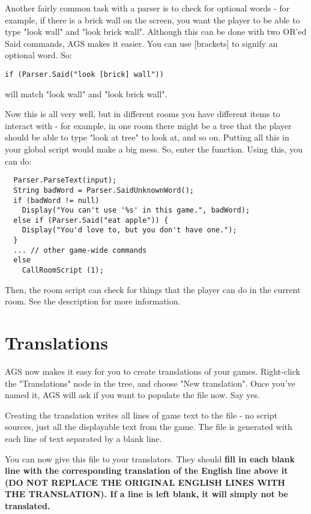 Another fairly common task with a parser is to check for optional words - for example,
if there is a brick wall on the screen, you want the player to be able to type "look wall"
and "look brick wall". Although this can be done with two OR'ed Said commands, AGS makes it
easier. You can use [brackets] to signify an optional word. So:
\begin{verbatim}
if (Parser.Said("look [brick] wall"))
\end{verbatim}
will match "look wall" and "look brick wall".

Now this is all very well, but in different rooms you have different items to interact
with - for example, in one room there might be a tree that the player should be able
to type "look at tree" to look at, and so on. Putting all this in your global script would make
a big mess. So, enter the  function. Using this,
you can do:
\begin{verbatim}
  Parser.ParseText(input);
  String badWord = Parser.SaidUnknownWord();
  if (badWord != null)
    Display("You can't use '%s' in this game.", badWord);
  else if (Parser.Said("eat apple")) {
    Display("You'd love to, but you don't have one.");
  }
  ... // other game-wide commands
  else
    CallRoomScript (1);
\end{verbatim}

Then, the room script can check for things that the player can do in the current room.
See the  description for more information.

\section{Translations}%

AGS now makes it easy for you to create translations of your games.
Right-click the "Translations" node in the tree, and choose "New translation". Once
you've named it, AGS will ask if you want to populate the file now. Say yes.

Creating the translation writes all lines of game text to the file - no script
sources, just all the displayable text from the game. The file is generated with
each line of text separated by a blank line.

You can now give this file to your translators. They should \bf{fill in each blank line
with the corresponding translation of the English line above it (DO NOT REPLACE THE
ORIGINAL ENGLISH LINES WITH THE TRANSLATION)}. If a line is left blank, it will simply
not be translated.

